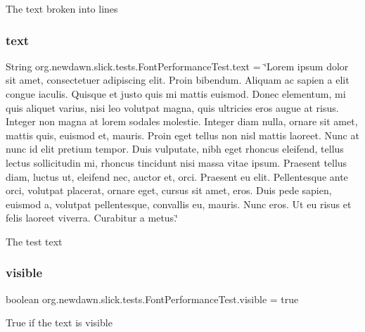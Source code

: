 The text broken into lines \mbox{\label{classorg_1_1newdawn_1_1slick_1_1tests_1_1_font_performance_test_a328e2fdc2cb6a5efd2a5c6388329c739}} 
\subsubsection{\texorpdfstring{text}{text}}
{\footnotesize\ttfamily String org.\+newdawn.\+slick.\+tests.\+Font\+Performance\+Test.\+text = \char`\"{}Lorem ipsum dolor sit amet, consectetuer adipiscing elit. Proin bibendum. Aliquam ac sapien a elit congue iaculis. Quisque et justo quis mi mattis euismod. Donec elementum, mi quis aliquet varius, nisi leo volutpat magna, quis ultricies eros augue at risus. Integer non magna at lorem sodales molestie. Integer diam nulla, ornare sit amet, mattis quis, euismod et, mauris. Proin eget tellus non nisl mattis laoreet. Nunc at nunc id elit pretium tempor. Duis vulputate, nibh eget rhoncus eleifend, tellus lectus sollicitudin mi, rhoncus tincidunt nisi massa vitae ipsum. Praesent tellus diam, luctus ut, eleifend nec, auctor et, orci. Praesent eu elit. Pellentesque ante orci, volutpat placerat, ornare eget, cursus sit amet, eros. Duis pede sapien, euismod a, volutpat pellentesque, convallis eu, mauris. Nunc eros. Ut eu risus et felis laoreet viverra. Curabitur a metus.\char`\"{}\hspace{0.3cm}{\ttfamily [private]}}

The test text \mbox{\label{classorg_1_1newdawn_1_1slick_1_1tests_1_1_font_performance_test_a1ff056a4500b0f543cee4f88d13dabae}} 
\subsubsection{\texorpdfstring{visible}{visible}}
{\footnotesize\ttfamily boolean org.\+newdawn.\+slick.\+tests.\+Font\+Performance\+Test.\+visible = true\hspace{0.3cm}{\ttfamily [private]}}

True if the text is visible 